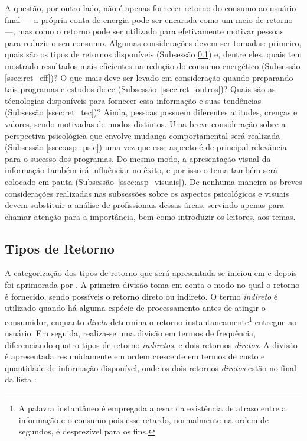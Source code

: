 A questão, por outro lado, não é apenas fornecer retorno do consumo ao usuário
final --- a própria conta de energia pode ser encarada como um meio de retorno
---, mas como o retorno pode ser utilizado para efetivamente motivar pessoas
para reduzir o seu consumo. Algumas considerações devem ser tomadas: primeiro,
quais são os tipos de retornos disponíveis (Subsessão \ref{ssec:ret_tipos}) e,
dentre eles, quais tem mostrado resultados mais eficientes na redução do
consumo energético (Subsessão \ref{ssec:ret_eff})? O que mais deve ser levado
em consideração quando preparando tais programas e estudos de \gls{ee}
(Subsessão~\ref{ssec:ret_outros})? Quais são as técnologias disponíveis para
fornecer essa informação e suas tendências (Subsessão \ref{ssec:ret_tec})?
Ainda, pessoas possuem diferentes atitudes, crenças e valores, sendo motivadas
de modos distintos. Uma breve consideração sobre a perspectiva psicológica que
envolve mudança comportamental será realizada (Subsessão \ref{ssec:asp_psic})
uma vez que esse aspecto é de principal relevância para o sucesso dos
programas.  Do mesmo modo, a apresentação visual da informação também irá
influênciar no êxito, e por isso o tema também será colocado em pauta
(Subsessão~\ref{ssec:asp_visuais}). De nenhuma maneira as breves considerações
realizadas nas subsessões sobre os aspectos psicológicos e visuais devem
substituir a análise de profissionais dessas áreas, servindo apenas para chamar
atenção para a importância, bem como introduzir os leitores, aos temas. 

\subsection{Tipos de Retorno}
\label{ssec:ret_tipos}

A categorização dos tipos de retorno que será apresentada se iniciou em
\cite{2000_darby} e depois foi aprimorada por \cite{2009_epri}. A primeira divisão
toma em conta o modo no qual o retorno é fornecido, sendo possíveis o retorno 
direto ou indireto. O termo \emph{indireto} é
utilizado quando há alguma espécie de processamento antes de atingir o
consumidor, enquanto \emph{direto} determina o retorno
instantaneamente\footnote{A palavra instantâneo é empregada apesar da
existência de atraso entre a informação e o consumo pois esse
retardo, normalmente na ordem de segundos, é desprezível para os fins.} entregue
ao usuário. Em seguida, realiza-se uma divisão em termos de frequência,
diferenciando quatro tipos de retorno \emph{indiretos}, e dois retornos
\emph{diretos}. A divisão é apresentada resumidamente em ordem crescente em 
termos de custo e 
quantidade de informação disponível, onde os dois retornos \emph{diretos} estão no
final da lista \cite{aceee_2010_estudos_feedback,2009_epri}:

